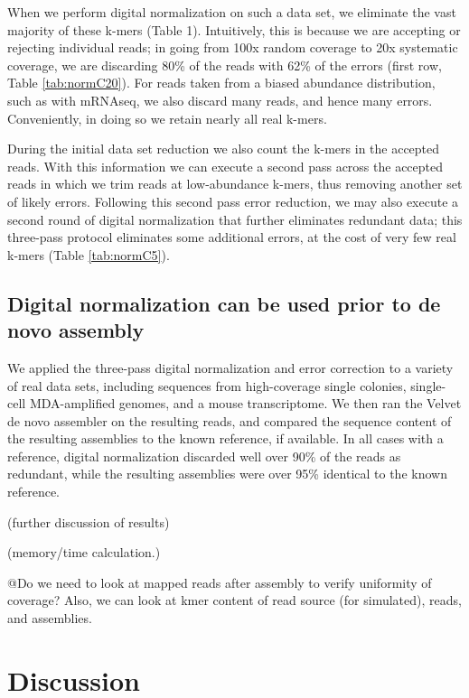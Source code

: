 \documentclass[10pt,draft]{article}
\begin{document}
When we perform digital normalization on such a data set, we eliminate
the vast majority of these k-mers (Table 1).  Intuitively, this is
because we are accepting or rejecting individual reads; in going from
100x random coverage to 20x systematic coverage, we are discarding
80\% of the reads with 62\% of the errors (first row, Table \ref{tab:normC20}).
For reads taken from a biased abundance distribution, such as with
mRNAseq, we also discard many reads, and hence many errors.
Conveniently, in doing so we retain nearly all real k-mers.

During the initial data set reduction we also count the k-mers in the
accepted reads.  With this information we can execute a second pass
across the accepted reads in which we trim reads at low-abundance
k-mers, thus removing another set of likely errors.  Following this
second pass error reduction, we may also execute a second round of
digital normalization that further eliminates redundant data; this
three-pass protocol eliminates some additional errors, at the cost
of very few real k-mers (Table \ref{tab:normC5}).

\subsection*{Digital normalization can be used prior to de novo assembly}

We applied the three-pass digital normalization and error correction
to a variety of real data sets, including sequences from high-coverage
single colonies, single-cell MDA-amplified genomes, and a mouse
transcriptome.  We then ran the Velvet de novo assembler on the
resulting reads, and compared the sequence content of the resulting
assemblies to the known reference, if available.  In all cases with
a reference, digital normalization discarded well over 90\% of the
reads as redundant, while the resulting assemblies were over 95\%
identical to the known reference.

(further discussion of results)

(memory/time calculation.)

@Do we need to look at mapped reads after assembly to verify uniformity
of coverage? Also, we can look at kmer content of read source (for
simulated), reads, and assemblies.

\section*{Discussion}
\end{document}
